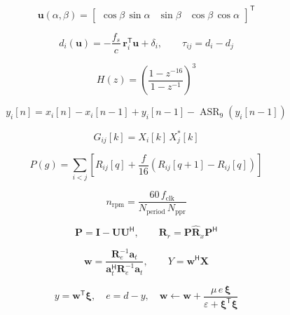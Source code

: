 \[\mathbf{u}(\alpha,\beta)={\begin{bmatrix}\cos\beta\,\sin\alpha & \sin\beta & \cos\beta\,\cos\alpha\end{bmatrix}}^{\mathsf{T}}\tag{2-1}\]

\[d_i(\mathbf{u})=-\frac{f_s}{c}\,\mathbf{r}_i^{\mathsf{T}}\mathbf{u}+\delta_i,\qquad \tau_{ij}=d_i-d_j\tag{2-2}\]

\[H(z)=\left(\frac{1-z^{-16}}{1-z^{-1}}\right)^3\tag{2-3}\]

\[y_i[n]=x_i[n]-x_i[n-1]+y_i[n-1]-\operatorname{ASR}_{9}\!\left(y_i[n-1]\right)\tag{2-4}\]

\[G_{ij}[k]=X_i[k]\,X_j^{*}[k]\tag{2-5}\]

\[P(g)=\sum_{i<j}\left[R_{ij}[q]+\frac{f}{16}\left(R_{ij}[q+1]-R_{ij}[q]\right)\right]\tag{2-6}\]

\[n_{\mathrm{rpm}}=\frac{60\,f_{\mathrm{clk}}}{N_{\mathrm{period}}\,N_{\mathrm{ppr}}}\tag{2-7}\]

\[\mathbf{P}=\mathbf{I}-\mathbf{U}\mathbf{U}^{\mathsf{H}},\qquad \mathbf{R}_{r}=\mathbf{P}\widehat{\mathbf{R}}_{x}\mathbf{P}^{\mathsf{H}}\tag{2-8}\]

\[\mathbf{w}=\frac{\mathbf{R}_{e}^{-1}\mathbf{a}_{t}}{\mathbf{a}_{t}^{\mathsf{H}}\mathbf{R}_{e}^{-1}\mathbf{a}_{t}},\qquad Y=\mathbf{w}^{\mathsf{H}}\mathbf{X}\tag{2-9}\]

\[y=\mathbf{w}^{\mathsf{T}}\boldsymbol{\xi},\quad e=d-y,\quad \mathbf{w}\leftarrow\mathbf{w}+\frac{\mu\,e\,\boldsymbol{\xi}}{\varepsilon+\boldsymbol{\xi}^{\mathsf{T}}\boldsymbol{\xi}}\tag{2-10}\]
